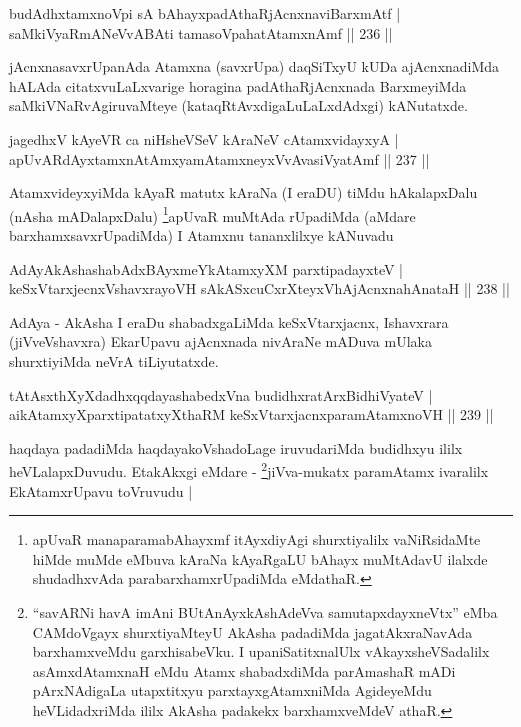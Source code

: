 \begin{shl}
budAdhxtamxnoV\s pi sA bAhayxpadAthaRjAcnxnaviBarxmAtf |\\
saMkiVyaRmANeVvA\s \s BAti tamasoVpahatAtamxnAmf \hfill || 236 ||
\end{shl}

\begin{artha}
jAcnxnasavxrUpanAda Atamxna (savxrUpa) daqSiTxyU kUDa ajAcnxnadiMda hALAda citatxvuLaLxvarige horagina padAthaRjAcnxnada BarxmeyiMda saMkiVNaRvAgiruvaMteye (kataqRtAvxdigaLuLaLxdAdxgi) kANutatxde.
\end{artha}

\begin{shl}
jagedhxV kAyeVR ca niHsheVSeV kAraNeV cA\s \s tamxvidayxyA |\\
apUvARdAyxtamxnA\s \s tAmx\s yamAtamxneyxVvAvasiVyatAmf \hfill || 237 ||
\end{shl}

\begin{artha}
AtamxvideyxyiMda kAyaR matutx kAraNa (I eraDU) tiMdu hAkalapxDalu 
(nAsha mADalapxDalu) \footnote{apUvaR manaparamabAhayxmf itAyxdiyAgi 
shurxtiyalilx vaNiRsidaMte hiMde muMde eMbuva kAraNa kAyaRgaLU bAhayx muMtAdavU ilalxde shudadhxvAda parabarxhamxrUpadiMda eMdathaR.}apUvaR muMtAda rUpadiMda (aMdare barxhamxsavxrUpadiMda) I Atamxnu tananxlilxye kANuvadu
\end{artha}


\begin{shl}
AdAyAkAshashabAdxBAyxmeYkAtamxyXM parxtipadayxteV |\\
keSxVtarxjecnxVshavxrayoVH sAkASxcuCxrXteyxVhAjAcnxnahAnataH \hfill || 238 ||
\end{shl}

\begin{artha}
AdAya - AkAsha I eraDu shabadxgaLiMda keSxVtarxjacnx, Ishavxrara (jiVveVshavxra) EkarUpavu ajAcnxnada nivAraNe mADuva mUlaka shurxtiyiMda neVrA tiLiyutatxde.
\end{artha}

\begin{shl}
tAtAsxthXyXdadhxqqdayashabedxVna budidhxratArxBidhiVyateV |\\
aikAtamxyXparxtipatatxyXthaRM keSxVtarxjacnxparamAtamxnoVH \hfill || 239 ||
\end{shl}

\begin{artha}
haqdaya padadiMda haqdayakoVshadoLage iruvudariMda budidhxyu ililx 
heVLalapxDuvudu. EtakAkxgi eMdare - \footnote{``savARNi havA imAni BUtAnAyxkAshAdeVva samutapxdayxneVtx'' eMba 
CAMdoVgayx shurxtiyaMteyU AkAsha padadiMda jagatAkxraNavAda barxhamxveMdu garxhisabeVku. I upaniSatitxnalUlx vAkayxsheVSadalilx asAmxdAtamxnaH eMdu Atamx shabadxdiMda parAmashaR mADi pArxNAdigaLa utapxtitxyu parxtayxgAtamxniMda AgideyeMdu heVLidadxriMda ililx AkAsha padakekx barxhamxveMdeV athaR.}jiVva-mukatx paramAtamx ivaralilx EkAtamxrUpavu toVruvudu |
\end{artha}

